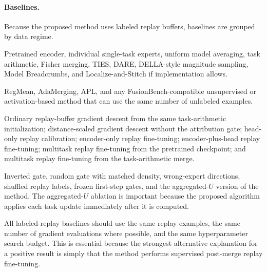 \documentclass[11pt]{article}
\begin{document}
\paragraph{Baselines.}
Because the proposed method uses labeled replay buffers, baselines are grouped by data regime.
\begin{description}[style=nextline,leftmargin=1.7em,labelindent=0pt]
    \item[Checkpoint-only baselines.] Pretrained encoder, individual single-task experts, uniform model averaging, task arithmetic, Fisher merging, TIES, DARE, DELLA-style magnitude sampling, Model Breadcrumbs, and Localize-and-Stitch if implementation allows.
    \item[Data-dependent but label-free baselines.] RegMean, AdaMerging, APL, and any FusionBench-compatible unsupervised or activation-based method that can use the same number of unlabeled examples.
    \item[Labeled-replay baselines.] Ordinary replay-buffer gradient descent from the same task-arithmetic initialization; distance-scaled gradient descent without the attribution gate; head-only replay calibration; encoder-only replay fine-tuning; encoder-plus-head replay fine-tuning; multitask replay fine-tuning from the pretrained checkpoint; and multitask replay fine-tuning from the task-arithmetic merge.
    \item[Sanity controls.] Inverted gate, random gate with matched density, wrong-expert directions, shuffled replay labels, frozen first-step gates, and the aggregated-$U$ version of the method. The aggregated-$U$ ablation is important because the proposed algorithm applies each task update immediately after it is computed.
\end{description}
All labeled-replay baselines should use the same replay examples, the same number of gradient evaluations where possible, and the same hyperparameter search budget. This is essential because the strongest alternative explanation for a positive result is simply that the method performs supervised post-merge replay fine-tuning.
\end{document}
